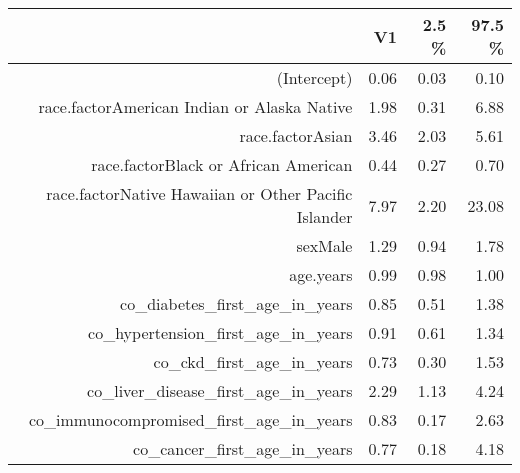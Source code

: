 \begin{table}[ht]
\centering
\begin{tabular}{rrrr}
  \hline
 & V1 & 2.5 \% & 97.5 \% \\ 
  \hline
(Intercept) & 0.06 & 0.03 & 0.10 \\ 
  race.factorAmerican Indian or Alaska Native & 1.98 & 0.31 & 6.88 \\ 
  race.factorAsian & 3.46 & 2.03 & 5.61 \\ 
  race.factorBlack or African American & 0.44 & 0.27 & 0.70 \\ 
  race.factorNative Hawaiian or Other Pacific Islander & 7.97 & 2.20 & 23.08 \\ 
  sexMale & 1.29 & 0.94 & 1.78 \\ 
  age.years & 0.99 & 0.98 & 1.00 \\ 
  co\_diabetes\_first\_age\_in\_years & 0.85 & 0.51 & 1.38 \\ 
  co\_hypertension\_first\_age\_in\_years & 0.91 & 0.61 & 1.34 \\ 
  co\_ckd\_first\_age\_in\_years & 0.73 & 0.30 & 1.53 \\ 
  co\_liver\_disease\_first\_age\_in\_years & 2.29 & 1.13 & 4.24 \\ 
  co\_immunocompromised\_first\_age\_in\_years & 0.83 & 0.17 & 2.63 \\ 
  co\_cancer\_first\_age\_in\_years & 0.77 & 0.18 & 4.18 \\ 
   \hline
\end{tabular}
\end{table}
